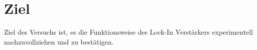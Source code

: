 \section{Ziel}
\label{sec:Ziel}

Ziel des Versuchs ist, es die Funktionsweise des Lock-In Verstärkers
experimentell nachzuvollziehen und zu bestätigen.
